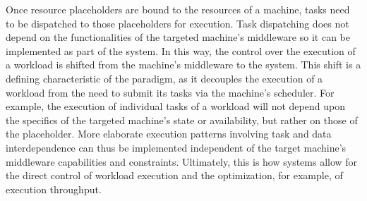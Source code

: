 \documentclass{sig-alternate}
\begin{document}

Once resource placeholders are bound to the resources of a machine, tasks need
to be dispatched to those placeholders for execution. Task dispatching does not
depend on the functionalities of the targeted machine's middleware so it can be
implemented as part of the \pilotjob system. In this way, the control over the
execution of a workload is shifted from the machine's middleware to the \pilot
system. This shift is a defining characteristic of the \pilot paradigm, as it
decouples the execution of a workload from the need to submit its tasks via the
machine's scheduler. For example, the execution of individual tasks of a
workload will not depend upon the specifics of the targeted machine's state or
availability, but rather on those of the placeholder. More elaborate execution
patterns involving task and data interdependence can thus be implemented
independent of the target machine's middleware capabilities and
constraints. Ultimately, this is how \pilotjob systems allow for the direct
control of workload execution and the optimization, for example, of execution
throughput.



\end{document}
